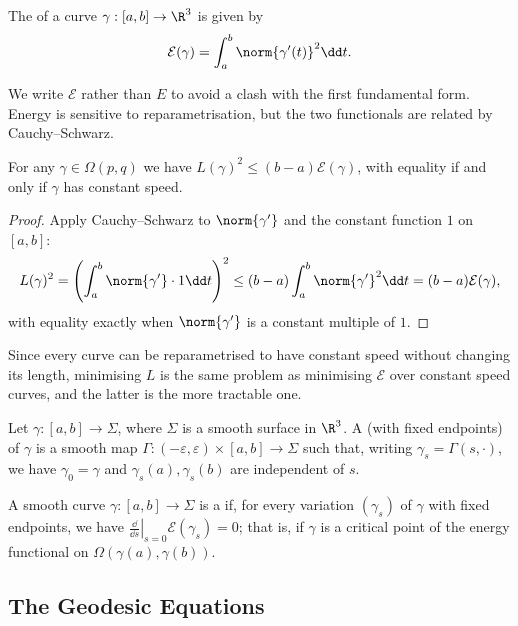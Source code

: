 \begin{definition}[Energy]
    The  of a curve $\gamma: [a,b] \rightarrow \R^3$ is given by
    $$\mathcal{E}(\gamma) = \int_a^b \norm{\gamma'(t)}^2 \dd t.$$
\end{definition}

We write $\mathcal E$ rather than $E$ to avoid a clash with the first fundamental form. Energy is sensitive to reparametrisation, but the two functionals are related by Cauchy--Schwarz.

\begin{lemma}
    For any $\gamma \in \Omega(p,q)$ we have $L(\gamma)^2 \leq (b-a)\mathcal{E}(\gamma)$, with equality if and only if $\gamma$ has constant speed.
\end{lemma}
\begin{proof}
    Apply Cauchy--Schwarz to $\norm{\gamma'}$ and the constant function $1$ on $[a,b]$:
    $$
    L(\gamma)^2 = \left(\int_a^b \norm{\gamma'}\cdot 1 \dd t\right)^2 \leq (b-a)\int_a^b \norm{\gamma'}^2\dd t = (b-a)\mathcal{E}(\gamma),
    $$
    with equality exactly when $\norm{\gamma'}$ is a constant multiple of $1$.
\end{proof}

Since every curve can be reparametrised to have constant speed without changing its length, minimising $L$ is the same problem as minimising $\mathcal E$ over constant speed curves, and the latter is the more tractable one.

\begin{definition}
    Let $\gamma: [a, b] \rightarrow \Sigma$, where $\Sigma$ is a smooth surface in $\R^3$. A  (with fixed endpoints) of $\gamma$ is a smooth map $\Gamma: (-\varepsilon, \varepsilon) \times [a, b] \rightarrow \Sigma$ such that, writing $\gamma_s = \Gamma(s, \cdot)$, we have $\gamma_0 = \gamma$ and $\gamma_s(a), \gamma_s(b)$ are independent of $s$.
\end{definition}

\begin{definition}[Geodesic]
    A smooth curve $\gamma: [a, b] \rightarrow \Sigma$ is a  if, for every variation $(\gamma_s)$ of $\gamma$ with fixed endpoints, we have $\left.\frac{\dd}{\dd s}\right|_{s = 0} \mathcal{E}(\gamma_s) = 0$; that is, if $\gamma$ is a critical point of the energy functional on $\Omega(\gamma(a), \gamma(b))$.
\end{definition}

\subsection{The Geodesic Equations}

